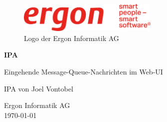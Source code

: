 \begin{titlepage}

    \begin{figure}
        \begin{center}
            \includegraphics[width=0.6\textwidth]{ressourcen/ergon_logo_gross}
            \captionsetup{textformat=empty, labelformat=empty}
            \caption[Logo der Ergon Informatik AG~\parencite{ergonlogo}]{Logo der Ergon Informatik AG}\label{fig:ergon-logo-gross}
        \end{center}
    \end{figure}
    \begin{center}
        \vspace*{2cm}
        \Huge
        \textbf{IPA}

        \vspace{0.5cm}
        \Large
        Eingehende Message-Queue-Nachrichten im Web-UI

        \vfill

        \Large
        IPA von Joel Vontobel

        \vspace*{3cm}

        \large
        Ergon Informatik AG\\
        \today\\

    \end{center}
\end{titlepage}
